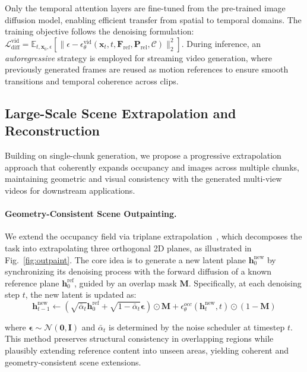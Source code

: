 Only the temporal attention layers are fine-tuned from the pre-trained image diffusion model, enabling efficient transfer from spatial to temporal domains. The training objective follows the denoising formulation:
$\mathcal{L}_{\text{diff}}^{\text{vid}} = \mathbb{E}_{t,\mathbf{x}_0,\epsilon} [ \| \epsilon - \epsilon_{\theta}^{\text{vid}}(\mathbf{x}_t, t, \mathbf{F}_{\text{ref}}, \mathbf{P}_{\text{rel}}, \mathcal{C}) \|_2^2 ]$.
During inference, an \textit{autoregressive} strategy is employed for streaming video generation, where previously generated frames are reused as motion references to ensure smooth transitions and temporal coherence across clips.


\subsection{Large-Scale Scene Extrapolation and Reconstruction}
\label{sec_extrapolate}
Building on single-chunk generation, we propose a progressive extrapolation approach that coherently expands occupancy and images across multiple chunks, maintaining geometric and visual consistency with the generated multi-view videos for downstream applications.

\paragraph{Geometry-Consistent Scene Outpainting.}
We extend the occupancy field via triplane extrapolation~\cite{BlockFusion}, which decomposes the task into extrapolating three orthogonal 2D planes, as illustrated in Fig.~\ref{fig:outpaint}. The core idea is to generate a new latent plane $\mathbf{h}_0^{\text{new}}$ by synchronizing its denoising process with the forward diffusion of a known reference plane $\mathbf{h}_0^{\text{ref}}$, guided by an overlap mask $\mathbf{M}$.
Specifically, at each denoising step $t$, the new latent is updated as:
\begin{equation}
\mathbf{h}^{\text{new}}_{t-1} \gets \left( \sqrt{\bar{\alpha}_t}\mathbf{h}^{\text{ref}}_0 + \sqrt{1 - \bar{\alpha}_t} \boldsymbol{\epsilon} \right) \odot \mathbf{M} + \epsilon_{\theta}^{\textit{occ}}(\mathbf{h}^{\text{new}}_t, t) \odot (1 - \mathbf{M})
\end{equation}

where $\boldsymbol{\epsilon} \sim \mathcal{N}(\mathbf{0}, \mathbf{I})$ and $\bar{\alpha}_t$ is determined by the noise scheduler at timestep $t$.
This method preserves structural consistency in overlapping regions while plausibly extending reference content into unseen areas, yielding coherent and geometry-consistent scene extensions.

